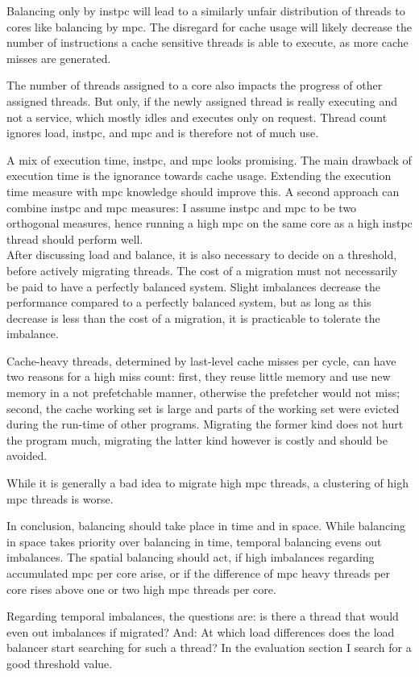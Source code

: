 Balancing only by \gls{instpc} will lead to a similarly unfair distribution of
threads to cores like balancing by \gls{mpc}.
The disregard for cache usage will likely decrease the number of instructions
a cache sensitive threads is able to execute, as more cache misses are
generated.

The number of threads assigned to a core also impacts the progress of other
assigned threads.
But only, if the newly assigned thread is really executing and not a service,
which mostly idles and executes only on request.
Thread count ignores load, \gls{instpc}, and \gls{mpc} and is therefore
not of much use.

A mix of execution time, \gls{instpc}, and \gls{mpc} looks promising.
The main drawback of execution time is the ignorance towards cache usage.
Extending the execution time measure with \gls{mpc} knowledge should improve this.
A second approach can combine \gls{instpc} and \gls{mpc} measures: I assume
\gls{instpc} and \gls{mpc} to be two orthogonal measures, hence running a
high \gls{mpc} on the same core as a high \gls{instpc} thread should perform
well.
\\


After discussing load and balance, it is also necessary to decide on a
threshold, before actively migrating threads.
The cost of a migration must not necessarily be paid to have a perfectly
balanced system.
Slight imbalances decrease the performance compared to a perfectly balanced
system, but as long as this decrease is less than the cost of a migration,
it is practicable to tolerate the imbalance.

Cache-heavy threads, determined by last-level cache misses per cycle, can have
two reasons for a high miss count: first, they reuse little memory and use new
memory in a not prefetchable manner, otherwise the prefetcher would not miss;
second, the cache working set is large and parts of the working set were
evicted during the run-time of other programs.
Migrating the former kind does not hurt the program much, migrating the latter
kind however is costly and should be avoided.

While it is generally a bad idea to migrate high \gls{mpc} threads, a
clustering of high \gls{mpc} threads is worse.

In conclusion, balancing should take place in time and in space.
While balancing in space takes priority over balancing in time, temporal
balancing evens out imbalances.
The spatial balancing should act, if high imbalances regarding accumulated
\gls{mpc} per core arise, or if the difference of \gls{mpc} heavy threads per
core rises above one or two high \gls{mpc} threads per core.

Regarding temporal imbalances, the questions are: is there a thread that would
even out imbalances if migrated?
And: At which load differences does the load balancer start searching for such
a thread?
In the evaluation section I search for a good threshold value.

